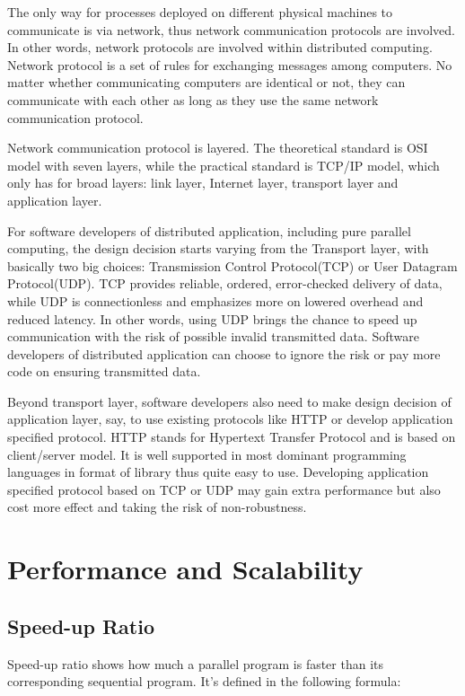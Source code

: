 \documentclass[12pt,a4]{report}
\begin{document}
The only way for processes deployed on different physical machines to communicate is via network, thus network communication protocols are involved. In other words, network protocols are involved within distributed computing. Network protocol is a set of rules for exchanging messages among computers. No matter whether communicating computers are identical or not, they can communicate with each other as long as they use the same network communication protocol.

Network communication protocol is layered. The theoretical standard is OSI model with seven layers, while the practical standard is TCP/IP model, which only has for broad layers: link layer, Internet layer, transport layer and application layer.

For software developers of distributed application, including pure parallel computing, the design decision starts varying from the Transport layer, with basically two big choices: Transmission Control Protocol(TCP) or User Datagram Protocol(UDP). TCP provides reliable, ordered, error-checked delivery of data, while UDP is connectionless and emphasizes more on lowered overhead and reduced latency. In other words, using UDP brings the chance to speed up communication with the risk of possible invalid transmitted data. Software developers of distributed application can choose to ignore the risk or pay more code on ensuring transmitted data.

Beyond transport layer, software developers also need to make design decision of application layer, say, to use existing protocols like HTTP or develop application specified protocol. HTTP stands for Hypertext Transfer Protocol and is based on client/server model. It is well supported in most dominant programming languages in format of library thus quite easy to use. Developing application specified protocol based on TCP or UDP may gain extra performance but also cost more effect and taking the risk of non-robustness.

\section{Performance and Scalability}

\subsection{Speed-up Ratio}

Speed-up ratio shows how much a parallel program is faster than its corresponding sequential program. It's defined in the following formula:
\end{document}
